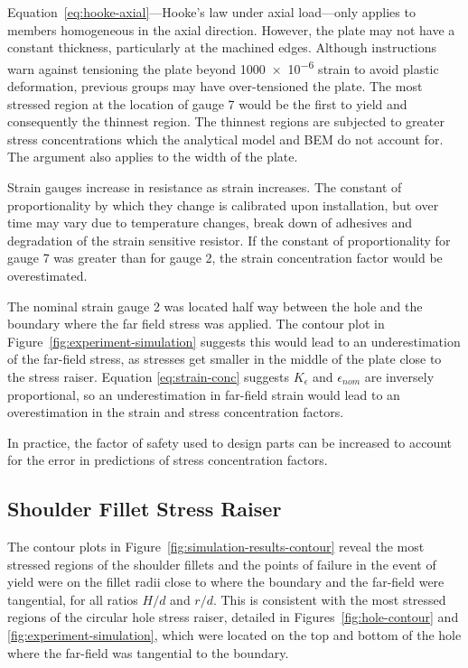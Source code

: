 \documentclass[a4paper,11pt,twocolumn]{article}
\newcommand{\BEM}{\textsc{BEM}\xspace}
\begin{document}
Equation~\eqref{eq:hooke-axial}---Hooke's law under axial load---only applies
to members homogeneous in the axial direction. However, the plate may not have a
constant thickness, particularly at the machined edges. Although instructions
warn against tensioning the plate beyond \num{1000e-6} strain to avoid plastic
deformation, previous groups may have over-tensioned the plate. The most
stressed region at the location of gauge 7 would be the first to yield and
consequently the thinnest region. The thinnest regions are subjected to greater
stress concentrations which the analytical model and \BEM do not account for.
The argument also applies to the width of the plate.

Strain gauges increase in resistance as strain increases. The constant of
proportionality by which they change is calibrated upon installation, but over
time may vary due to temperature changes, break down of adhesives and
degradation of the strain sensitive resistor. If the constant of
proportionality for gauge 7 was greater than for gauge 2, the strain
concentration factor would be overestimated.

The nominal strain gauge 2 was located half way between the hole and the
boundary where the far field stress was applied. The contour plot in
Figure~\ref{fig:experiment-simulation} suggests this would lead to an
underestimation of the far-field stress, as stresses get smaller in the middle
of the plate close to the stress raiser. Equation \eqref{eq:strain-conc}
suggests $K_{\epsilon}$ and $\epsilon_{nom}$ are inversely proportional, so an
underestimation in far-field strain would lead to an overestimation in the
strain and stress concentration factors.

In practice, the factor of safety used to design parts can be increased to
account for the error in predictions of stress concentration factors.

\subsection{Shoulder Fillet Stress Raiser}

The contour plots in Figure~\vref{fig:simulation-results-contour} reveal the
most stressed regions of the shoulder fillets and the points of failure in
the event of yield were on the fillet radii close to where the boundary and the
far-field were tangential, for all ratios $H/d$ and $r/d$. This is consistent
with the most stressed regions of the circular hole stress raiser, detailed in 
Figures~\ref{fig:hole-contour} and \ref{fig:experiment-simulation}, which were
located on the top and bottom of the hole where the far-field was tangential to
the boundary.
\end{document}
